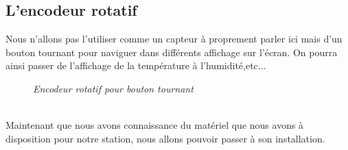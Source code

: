 \subsection{L'encodeur rotatif}

Nous n'allons pas l'utiliser comme un capteur à proprement parler ici mais d'un bouton tournant pour naviguer dans différents affichage sur l'écran. On pourra ainsi passer de l'affichage de la température à l'humidité,etc...\\

\begin{figure}[H]
\begin{center}
\end{center}
	\caption{ \textit{Encodeur rotatif pour bouton tournant}}
\end{figure}\\

Maintenant que nous avons connaissance du matériel que nous avons à disposition pour notre station, nous allons pouvoir passer à son installation.





